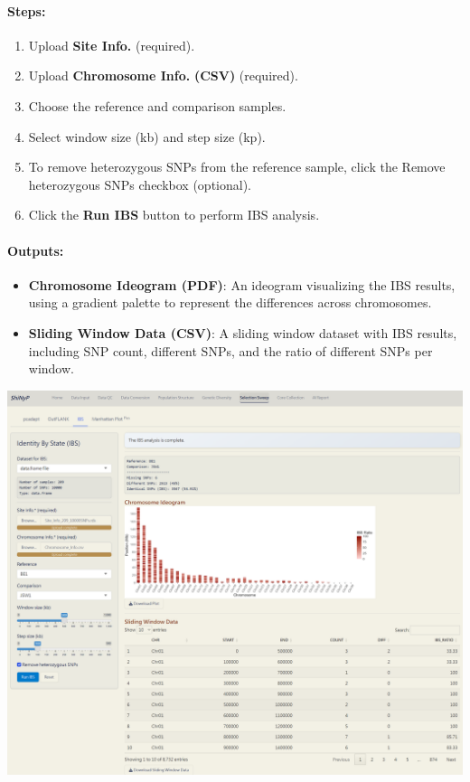 \documentclass[
]{book}
\begin{document}
\paragraph*{\texorpdfstring{\textbf{Steps:}}{Steps:}}\label{steps-9}

\begin{enumerate}
\def\labelenumi{\arabic{enumi}.}
\item
  {Upload} \textbf{Site Info.} (required).
\item
  {Upload} \textbf{Chromosome Info.} \textbf{(CSV)} (required).
\item
  Choose the reference and comparison samples.
\item
  Select window size (kb) and step size (kp).
\item
  To remove heterozygous SNPs from the reference sample, click the {Remove heterozygous SNPs} checkbox (optional).
\item
  Click the {\textbf{Run IBS}} button to perform IBS analysis.
\end{enumerate}

\paragraph*{Outputs:}\label{outputs-18}

\begin{itemize}
\item
  \textbf{Chromosome Ideogram (PDF)}: An ideogram visualizing the IBS results, using a gradient palette to represent the differences across chromosomes.
\item
  \textbf{Sliding Window Data (CSV)}: A sliding window dataset with IBS results, including SNP count, different SNPs, and the ratio of different SNPs per window.
\end{itemize}

\includegraphics{images/clipboard-4086295864.png}
\end{document}
